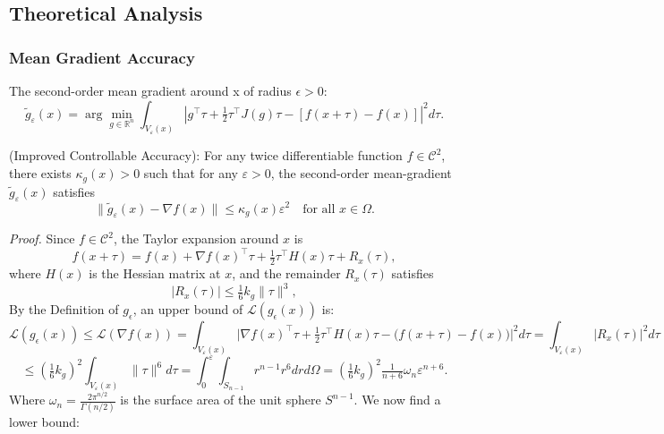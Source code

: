 \subsection{Theoretical Analysis}
\subsubsection{Mean Gradient Accuracy}
\label{mean_gradient_acc_proof}
\begin{definition}
       The second-order mean gradient around x of radius $\epsilon > 0$:   \[
   \tilde{g}_{\varepsilon}(x) = \arg\min_{g \in \mathbb{R}^n} \int_{V_{\varepsilon}(x)} \left| g^\top \tau + \tfrac{1}{2} \tau^\top J(g) \tau - [ f(x + \tau) - f(x) ] \right|^2 d\tau.
   \]
\end{definition}
\begin{theorem} (Improved Controllable Accuracy):
For any twice differentiable function \( f \in \mathcal{C}^2 \), there exists \( \kappa_g(x) > 0 \) such that for any \( \varepsilon > 0 \), the second-order mean-gradient \( \tilde{g}_{\varepsilon}(x) \) satisfies
\[
\| \tilde{g}_{\varepsilon}(x) - \nabla f(x) \| \leq \kappa_g(x) \varepsilon^2 \quad \text{for all } x \in \Omega.
\]
\end{theorem}
\textit{Proof.}
   Since \( f \in \mathcal{C}^2 \), the Taylor expansion around \( x \) is\[
   f(x + \tau) = f(x) + \nabla f(x)^\top \tau + \tfrac{1}{2} \tau^\top H(x) \tau + R_{x}(\tau),
   \]
   where \( H(x) \) is the Hessian matrix at \( x \), and the remainder \( R_{x}(\tau) \) satisfies \[
   | R_{x}(\tau) | \leq \tfrac{1}{6} k_g \| \tau \|^3,
   \]
By the Definition of \(g_\epsilon\), an upper bound of \(\mathcal{L}(g_\epsilon(x))\)  is:   \[
   \mathcal{L}(g_\epsilon(x)) \leq \mathcal{L}(\nabla f(x)) = \int_{V_{\varepsilon}(x)} \Big| \nabla f(x)^\top \tau + \tfrac{1}{2} \tau^\top H(x) \tau - \big( f(x + \tau) - f(x) \big) \Big|^2 d\tau = \int_{V_{\varepsilon}(x)} | R_{x}(\tau) |^2 d\tau
\]
\[
   \leq \left( \tfrac{1}{6} k_g \right)^2 \int_{V_{\varepsilon}(x)} \| \tau \|^6 d\tau = \int_0^\varepsilon \int_{S_{n-1}} r^{n-1}r^6 drd\Omega= \left( \tfrac{1}{6} k_g \right)^2 \tfrac{1}{n+6}\omega_n \varepsilon^{n+6}.
\]
Where  \(\omega_n = \tfrac{2\pi^{n/2}}{\Gamma(n/2)}\) is the surface area of the unit sphere \(S^{n-1}\).
We now find a lower bound:
   
